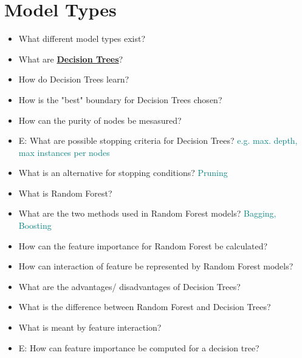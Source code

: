 \documentclass{report}
\newcommand{\asw}[2][teal]{}
\renewcommand{\asw}[2][teal]{\textcolor{#1}{#2}}
\begin{document}
	\section{Model Types}
	
	\begin{itemize}
		\item What different model types exist?
		\asw{\newline }
		
		\item What are \textbf{\underline{Decision Trees}}?
		\asw{\newline }
		\item How do Decision Trees learn?
		\asw{\newline }
		\item How is the "best" boundary for Decision Trees chosen?
		\asw{\newline }
		\item How can the purity of nodes be mesasured?
		\asw{\newline }
		\item E: What are possible stopping criteria for Decision Trees?
		\asw{\newline e.g. max. depth, max instances per nodes}
		\item What is an alternative for stopping conditions?
		\asw{\newline Pruning}
		\item What is Random Forest?
		\asw{\newline }
		\item What are the two methods used in Random Forest models?
		\asw{\newline Bagging, Boosting}
		\item How can the feature importance for Random Forest be calculated?
		\asw{\newline }
		\item How can interaction of feature be represented by Random Forest models?
		\asw{\newline }
		\item What are the advantages/ disadvantages of Decision Trees?
		\asw{\newline }
		\item What is the difference between Random Forest and Decision Trees?
		\asw{\newline }
		\item What is meant by feature interaction?
		\asw{\newline }
		\item E: How can feature importance be computed for a decision tree?
		\asw{\newline }
		

\end{itemize}
\end{document}
